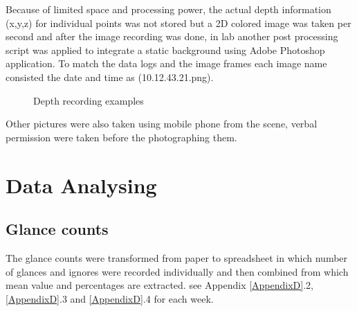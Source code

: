 \begin{enumerate}
Because of limited space and processing power, the actual depth information (x,y,z) for individual points was not stored but a 2D colored image was taken per second and after the image recording was done, in lab another post processing script was applied to integrate a static background using Adobe Photoshop application. To match the data logs and the image frames each image name consisted the date and time as (10.12.43.21.png).

\begin{figure}[!htb]
    \centering
    \caption{Depth recording examples}%
    \label{fig:DepthRecordedImages}%
\end{figure}

\end{enumerate}

Other pictures were also taken using mobile phone from the scene, verbal permission were taken before the photographing them.


\newpage
\section{Data Analysing}

 
\subsection {Glance counts} 
The glance counts were transformed from paper to spreadsheet in which number of glances and ignores were recorded individually and then combined from which mean value and percentages are extracted. see Appendix \ref{AppendixD}.2, \ref{AppendixD}.3 and \ref{AppendixD}.4 for each week.

